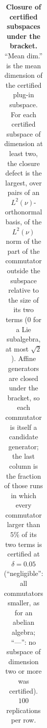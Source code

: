 \begin{table}[!htbp]
\begin{adjustbox}{max width=\textwidth, max totalheight=0.9\textheight}
\begin{tabular}{lrrrrrrr}
\bottomrule
\end{tabular}
\end{adjustbox}
\caption{\textbf{Closure of certified subspaces under the bracket.} ``Mean dim.'' is the mean dimension of the certified plug-in subspace. For each certified subspace of dimension at least two, the closure defect is the largest, over pairs of an $L^2(\nu)$-orthonormal basis, of the $L^2(\nu)$ norm of the part of the commutator outside the subspace relative to the size of its two terms (0 for a Lie subalgebra, at most $\sqrt 2$). Affine generators are closed under the bracket, so each commutator is itself a candidate generator; the last column is the fraction of those runs in which every commutator larger than $5\%$ of its two terms is certified at $\delta = 0.05$ (``negligible'': all commutators smaller, as for an abelian algebra; ``---'': no subspace of dimension two or more was certified). $100$ replications per row.}
\label{stab:closure}
\end{table}
